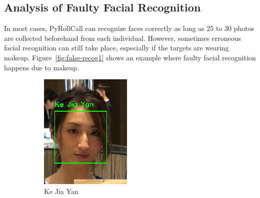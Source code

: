 \subsection{Analysis of Faulty Facial Recognition}
In most cases, PyRollCall can recognize faces correctly as long as 25 to 30 photos are collected
beforehand from each individual. However, sometimes erroneous facial recognition can still take place,
especially if the targets are wearing makeup. Figure~\ref{fig:false-recog1} shows an example where
faulty facial recognition happens due to makeup.
\vspace{0.2cm}

\begin{figure}[!htb]
  \centering
  \begin{subfigure}[b]{0.3\linewidth}
    \includegraphics[width=\linewidth]{figures/false-recog-correct1.png}
    \caption{Ke Jia Yan}
  \end{subfigure}
  \begin{subfigure}[b]{0.3\linewidth}

\end{subfigure}
\end{figure}

